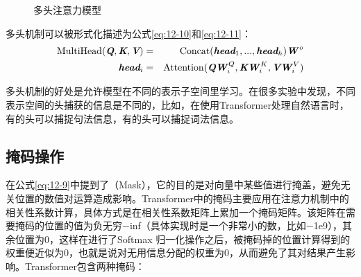 \begin{figure}[htp]
\centering

\caption{多头注意力模型}
\label{fig:12-12}
\end{figure}

\parinterval 多头机制可以被形式化描述为公式\eqref{eq:12-10}和\eqref{eq:12-11}：
\begin{eqnarray}
\textrm{MultiHead}(\textbf{\em Q}, \textbf{\em K} , \textbf{\em V})& = & \textrm{Concat} (\textbf{\em head}_1, ... , \textbf{\em head}_h ) \textbf{\em W}^{\,o} \label{eq:12-10} \\
\textbf{\em head}_i & = &\textrm{Attention} (\textbf{\em Q}\textbf{\em W}_i^{\,Q} , \textbf{\em K}\textbf{\em W}_i^{\,K}  , \textbf{\em V}\textbf{\em W}_i^{\,V} )
\label{eq:12-11}
\end{eqnarray}

\parinterval 多头机制的好处是允许模型在不同的表示子空间里学习。在很多实验中发现，不同表示空间的头捕获的信息是不同的，比如，在使用Transformer处理自然语言时，有的头可以捕捉句法信息，有的头可以捕捉词法信息。


\subsection{掩码操作}

\parinterval 在公式\eqref{eq:12-9}中提到了{\small{}}（Mask），它的目的是对向量中某些值进行掩盖，避免无关位置的数值对运算造成影响。Transformer中的掩码主要应用在注意力机制中的相关性系数计算，具体方式是在相关性系数矩阵上累加一个掩码矩阵。该矩阵在需要掩码的位置的值为负无穷$-$inf（具体实现时是一个非常小的数，比如$-$1e9），其余位置为0，这样在进行了Softmax 归一化操作之后，被掩码掉的位置计算得到的权重便近似为0，也就是说对无用信息分配的权重为0，从而避免了其对结果产生影响。Transformer包含两种掩码：

